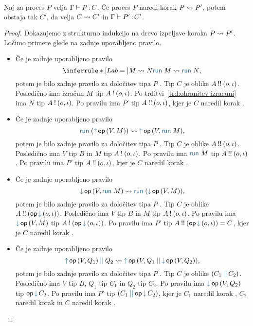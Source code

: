 \begin{izrek}[o ohranitvi]\label{izr:ohranitev}
	Naj za proces $P$ velja $\Gamma \vdash P \mathinner{:} C$. Če proces $P$ naredi korak $P \leadsto P'$, potem obstaja tak $C'$, da velja $C \rightsquigarrow C'$ in $\Gamma \vdash P' \mathinner{:} C'$.
\end{izrek}

\begin{proof}
	Dokazujemo z strukturno indukcijo na drevo izpeljave koraka $P \leadsto P'$.
	Ločimo primere glede na zadnje uporabljeno pravilo.
	
	\begin{itemize}
		\item Če je zadnje uporabljeno pravilo
		$$
		\coopinfer{}{
			M \reduces N
		}{
			\tmrun M \reduces \tmrun N
		},$$
		potem je bilo zadnje pravilo za določitev tipa $P$ . Tip $C$ je oblike $A \mathbin{!!} (o, \iota)$.
		Posledično ima izračun $M$ tip $A \mathbin{!} (o, \iota)$. Po trditvi~\ref{trd:ohranitev-izracuni} ima $N$ tip $A \mathbin{!} (o, \iota)$.
		Po pravilu  ima $P'$ tip $A \mathbin{!!} (o, \iota)$, kjer je $C$ naredil korak .
	
		\item Če je zadnje uporabljeno pravilo
		$$\tmrun {(\tmopout{op}{V}{M})}  \reduces \tmopout{op}{V}{\tmrun M},$$
		potem je bilo zadnje pravilo za določitev tipa $P$ . Tip $C$ je oblike $A \mathbin{!!} (o, \iota)$.
		Posledično ima $V$ tip $B$ in $M$ tip $A \mathbin{!} (o, \iota)$.
		Po pravilu  ima $\tmrun{M}$ tip $A \mathbin{!!} (o, \iota)$.
		Po pravilu  ima $P'$ tip $A \mathbin{!!} (o, \iota)$, kjer je $C$ naredil korak .
		
		\item Če je zadnje uporabljeno pravilo
		$$\tmopin{op}{V}{\tmrun M} \reduces \tmrun {(\tmopin{op}{V}{M})},$$
		potem je bilo zadnje pravilo za določitev tipa $P$ . Tip $C$ je oblike $\tyrun{A}{\opincomp{op}{(\o, \i)}}$.
		Posledično ima $V$ tip $B$ in $M$ tip $A \mathbin{!} (o, \iota)$.
		Po pravilu  ima $\tmopin{op}{V}{M}$ tip $\tycomp{A}{\opincomp{op}{(\o, \i)}}$.
		Po pravilu  ima $P'$ tip $\tyrun{A}{\opincomp{op}{(\o, \i)}} = C$, kjer je $C$ naredil korak .
		
		\item Če je zadnje uporabljeno pravilo
		$$\tmpar{\tmopout{op}{V}{Q_1}}{Q_2} \reduces \tmopout{op}{V}{\tmpar{Q_1}{\tmopin{op}{V}{Q_2}}},$$
		potem je bilo zadnje pravilo za določitev tipa $P$ . Tip $C$ je oblike $\typar{C_1}{C_2}$.
		Posledično ima $V$ tip $B$, $Q_1$ tip $C_1$ in $Q_2$ tip $C_2$.
		Po pravilu  ima $\tmopin{op}{V}{Q_2}$ tip $\opincomp{op}{C_2}$.
		Po pravilu  ima $P'$ tip $\typar{C_1}{\opincomp{op}{C_2}}$, kjer je $C_1$ naredil korak , $C_2$ naredil korak  in $C$ naredil korak .


\end{itemize}
\end{proof}
